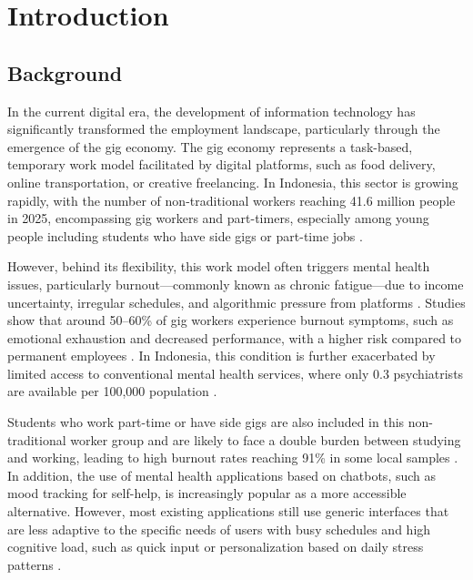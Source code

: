 \chapter{Introduction}

\section{Background}

In the current digital era, the development of information technology has significantly transformed the employment landscape, particularly through the emergence of the gig economy. The gig economy represents a task-based, temporary work model facilitated by digital platforms, such as food delivery, online transportation, or creative freelancing. In Indonesia, this sector is growing rapidly, with the number of non-traditional workers reaching 41.6 million people in 2025, encompassing gig workers and part-timers, especially among young people including students who have side gigs or part-time jobs \cite{bps2025tenagakerja, ilo2025worldemployment}.

However, behind its flexibility, this work model often triggers mental health issues, particularly burnout---commonly known as chronic fatigue---due to income uncertainty, irregular schedules, and algorithmic pressure from platforms \cite{frontiers2025gigwork}. Studies show that around 50--60\% of gig workers experience burnout symptoms, such as emotional exhaustion and decreased performance, with a higher risk compared to permanent employees \cite{jmir2025digitalinterventions}. In Indonesia, this condition is further exacerbated by limited access to conventional mental health services, where only 0.3 psychiatrists are available per 100,000 population \cite{kemenkes2025akseskesehatan}.

Students who work part-time or have side gigs are also included in this non-traditional worker group and are likely to face a double burden between studying and working, leading to high burnout rates reaching 91\% in some local samples \cite{syiahkuala2024burnout}. In addition, the use of mental health applications based on chatbots, such as mood tracking for self-help, is increasingly popular as a more accessible alternative. However, most existing applications still use generic interfaces that are less adaptive to the specific needs of users with busy schedules and high cognitive load, such as quick input or personalization based on daily stress patterns \cite{pmc2025scopingreview}.

